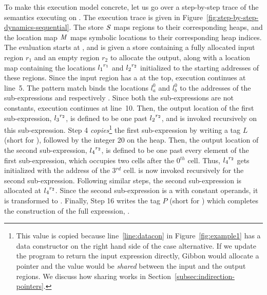 \documentclass[acmsmall,acmthm=false,nonacm]{acmart}
\theoremstyle{straighttext0}
\theoremstyle{straighttext}
\newcommand{\Secref}[1]{Section~\ref{#1}}
\newcommand{\Figref}[1]{Figure~\ref{#1}}
\newcommand{\new}[1]{#1}
\begin{document}
To make this execution model concrete, let us go over
a step-by-step trace of the semantics executing  on
.
%
%
The execution trace is given in \Figref{fig:step-by-step-dynamics-sequential}.
%
The store $\mathit{S}$ maps regions to their corresponding heaps, and
the location map $\mathit{M}$ maps symbolic locations to their corresponding
heap indices.
%
The evaluation starts at
,
and is given a store containing a fully allocated input region $r_1$
and an empty region $r_2$ to allocate the output,
along with a location map
containing the locations ${l_1}^{r_1}$ and ${l_2}^{r_2}$
initialized to the starting addresses of these regions.
%
Since the input region has a  at the top, 
execution continues at line~5.
%
The pattern match binds the locations $l_{a}^0$ and $l_{b}^0$ to
the addresses of the sub-expressions  and 
respectively .
%
Since both the sub-expressions are not constants, execution continues at line~10.
%
Then, the output location of the first sub-expression, ${l_3}^{r_2}$, is defined to
be one past ${l_2}^{r_2}$, and  is invoked recursively
on this sub-expression.
%
%
Step 4 \new{{\em copies}\footnote{\new{This value is copied because line~\ref{line:datacon} in \Figref{fig:example1} has a data constructor \il{(Lit $\;\locreg{l_2}{r_2}\;$ i)} on the right hand side of the case alternative. If we update the program to return the input expression \il{exp} directly, Gibbon would allocate a pointer and the value \il{(Lit 20)} would be {\em shared} between the input and the output regions. We discuss how sharing works in \Secref{subsec:indirection-pointers}.}}}
the first sub-expression by writing a tag $L$ (short for ),
followed by the integer 20 on the heap.
%
Then, the output location of the second sub-expression, ${l_4}^{r_2}$, is defined to be one past
every element of the first sub-expression, which occupies two cells after the 0$^{th}$ cell.
%
Thus, ${l_4}^{r_2}$ gets initialized with the address of the 3$^{rd}$ cell.
%
 is now invoked recursively
for the second sub-expression.
%
%
Following similar steps, the second sub-expression is allocated at ${l_4}^{r_2}$.
%
Since the second sub-expression is a  with constant operands,
it is transformed to .
%
Finally, Step 16 writes the tag $P$ (short for ) which
completes the construction of the full expression,
.
\end{document}

